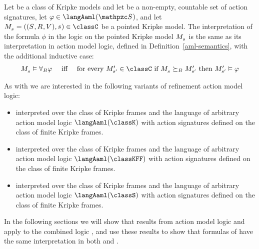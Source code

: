 \begin{definition}
Let \classC{} be a class of Kripke models and let \aSignatureFamily{} be a non-empty, countable set of action signatures, let $\phi \in \langAaml(\aSignatureFamily)$, and let $\kPModelAndTuple{\kStateS} \in \classC$ be a pointed Kripke model.
The interpretation of the formula $\phi$ in the logic \logicRamlC{} on the pointed Kripke model $\kPModel{\kStateS}$ is the same as its interpretation in action model logic, defined in Definition~\ref{aml-semantics}, with the additional inductive case:
$$
\begin{array}{lcl}
    \kPModel{\kStateS} \entails \allactsBs \phi & \text{ iff } & \text{for every } \kPModelP{\kStateSP} \in \classC \text{ if } \kPModel{\kStateS} \simulatesBs \kPModelP{\kStateSP} \text{ then } \kPModelP{\kStateSP} \entails \phi
\end{array}
$$
\end{definition}

As with \logicAaml{} we are interested in the following variants of refinement action model logic:
\begin{itemize}
    \item \logicRamlK{} interpreted over the class of \classK{} Kripke frames and the language of arbitrary action model logic $\langAaml(\classK)$ with action signatures defined on the class of finite \classK{} Kripke frames.
    \item \logicRamlKFF{} interpreted over the class of \classKFF{} Kripke frames and the language of arbitrary action model logic $\langAaml(\classKFF)$ with action signatures defined on the class of finite \classKFF{} Kripke frames.
    \item \logicRamlS{} interpreted over the class of \classS{} Kripke frames and the language of arbitrary action model logic $\langAaml(\classS)$ with action signatures defined on the class of finite \classS{} Kripke frames.
\end{itemize}

In the following sections we will show that results from action model logic and \logicRml{} apply to the combined logic \logicRaml{}, and use these results to show that formulas of \langAaml{} have the same interpretation in both \logicAaml{} and \logicRaml{}.
